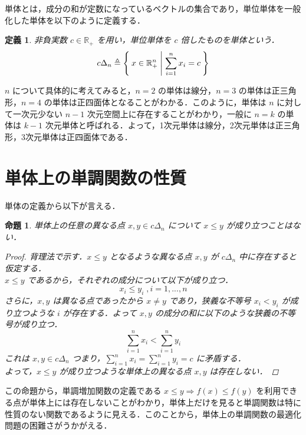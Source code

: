 \documentclass[a4paper,11pt]{jreport}
\newtheorem{definition}{定義}
\newtheorem{proposition}{命題}
\begin{document}
単体とは，成分の和が定数になっているベクトルの集合であり，単位単体を一般化した単体を以下のように定義する．

\begin{definition}
非負実数 $ c \in \mathbb{R}_+ $ を用い，単位単体を $ c $ 倍したものを単体という．
$$ c \Delta_n \triangleq \Set{ x \in \mathbb{R}^n_{+} | \sum_{i=1}^{n} x_i = c } $$
\end{definition}

$ n $ について具体的に考えてみると，$ n=2 $ の単体は線分，$ n=3 $ の単体は正三角形，$ n=4 $ の単体は正四面体となることがわかる．このように，単体は $ n $ に対して一次元少ない $ n - 1 $ 次元空間上に存在することがわかり，一般に $ n = k $ の単体は $ k - 1 $ 次元単体と呼ばれる．よって，1次元単体は線分，2次元単体は正三角形，3次元単体は正四面体である．\par

\section{単体上の単調関数の性質}

単体の定義から以下が言える．

\begin{proposition} \label{prop:inequality_on_simplex}
単体上の任意の異なる点 $ x, y \in c \Delta_n $ について $ x \leq y $ が成り立つことはない．

\begin{proof}
背理法で示す．$ x \leq y $ となるような異なる点 $ x, y $ が $ c \Delta_n $ 中に存在すると仮定する．\\
$ x \leq y $ であるから，それぞれの成分について以下が成り立つ．
$$ x_i \leq y_i \;, i = 1, ..., n $$
さらに，$ x , y $ は異なる点であったから $ x \neq y $ であり，狭義な不等号 $ x_i < y_i $ が成り立つような $ i $ が存在する．よって $ x, y $ の成分の和に以下のような狭義の不等号が成り立つ．
$$ \sum_{i=1}^n x_i < \sum_{i=1}^n y_i $$
これは $ x, y \in c \Delta_n $ つまり，$ \sum_{i=1}^n x_i = \sum_{i=1}^n y_i = c $ に矛盾する．\\
よって，$ x \leq y $ が成り立つような単体上の異なる点 $ x, y $ は存在しない．
\end{proof}

\end{proposition}

この命題から，単調増加関数の定義である $ x \leq y \Rightarrow f(x) \leq f(y) $ を利用できる点が単体上には存在しないことがわかり，単体上だけを見ると単調関数は特に性質のない関数であるように見える．このことから，単体上の単調関数の最適化問題の困難さがうかがえる．
\end{document}
